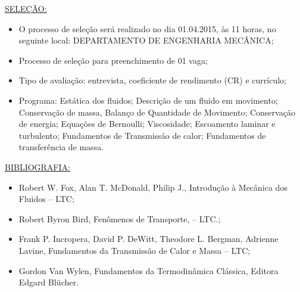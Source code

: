 \documentclass[a4paper,portuguese,12pt]{article}
\begin{document}
\underline{SELEÇÃO:}
\begin{itemize}
	\item O processo de seleção será realizado no dia 01.04.2015, às 11
	horas, no seguinte local: DEPARTAMENTO DE ENGENHARIA MECÂNICA;
	\item Processo de seleção para preenchimento de 01 vaga;
	\item Tipo de avaliação: entrevista, coeficiente de rendimento (CR)
	e currículo;
	\item Programa: Estática dos fluidos; Descrição de um fluido em
	movimento; Conservação de massa, Balanço de Quantidade de Movimento;
	Conservação de energia; Equações de Bernoulli; Viscosidade;
	Escoamento laminar e turbulento; Fundamentos de Transmissão de
	calor; Fundamentos de transferência de massa.
\end{itemize}

\vspace{1cm}

\underline{BIBLIOGRAFIA:}
\begin{itemize}
	\item Robert W. Fox, Alan T. McDonald, Philip J., Introdução à
	Mecânica dos Fluidos -- LTC;
	\item Robert Byron Bird, Fenômenos de Transporte, -- LTC.;
	\item Frank P. Incropera, David P. DeWitt, Theodore L. Bergman,
	Adrienne Lavine, Fundamentos da Transmissão de Calor e Massa -- LTC;
	\item Gordon Van Wylen, Fundamentos da Termodinâmica Clássica,
	Editora Edgard Blücher.
\end{itemize}
\end{document}
